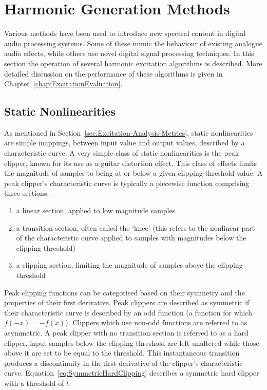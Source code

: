 \section{Harmonic Generation Methods}
\label{sec:Excitation-Methods}
	Various methods have been used to introduce new spectral content in digital audio processing systems.  Some of
	these mimic the behaviour of existing analogue audio effects, while others use novel digital signal processing
	techniques. In this section the operation of several harmonic excitation algorithms is described. More detailed
	discussion on the performance of these algorithms is given in Chapter~\ref{chap:ExcitationEvaluation}.

	\subsection{Static Nonlinearities}
	\label{sec:Excitation-Methods-Statics}
		As mentioned in Section~\ref{sec:Excitation-Analysis-Metrics}, static nonlinearities are simple mappings,
		between input value and output values, described by a characteristic curve. A very simple class of static
		nonlinearities is the peak clipper, known for its use as a guitar distortion effect. This class of effects
		limits the magnitude of samples to being at or below a given clipping threshold value. A peak clipper's
		characteristic curve is typically a piecewise function comprising three sections:

		\begin{enumerate}
			\item a linear section, applied to low magnitude samples
			\item a transition section, often called the `knee' (this refers to the nonlinear part of the
				characteristic curve applied to samples with magnitudes below the clipping threshold)
			\item a clipping section, limiting the magnitude of samples above the clipping threshold
		\end{enumerate}
		
		Peak clipping functions can be categorised based on their symmetry and the properties of their first
		derivative. Peak clippers are described as symmetric if their characteristic curve is described by an odd
		function (a function for which $f(-x) = -f(x)$). Clippers which use non-odd functions are referred to as
		asymmetric. A peak clipper with no transition section is referred to as a hard clipper, input samples below
		the clipping threshold are left unaltered while those above it are set to be equal to the threshold. This
		instantaneous transition produces a discontinuity in the first derivative of the clipper's characteristic
		curve. Equation~\ref{eq:SymmetricHardClipping} describes a symmetric hard clipper with a threshold of $t$.


